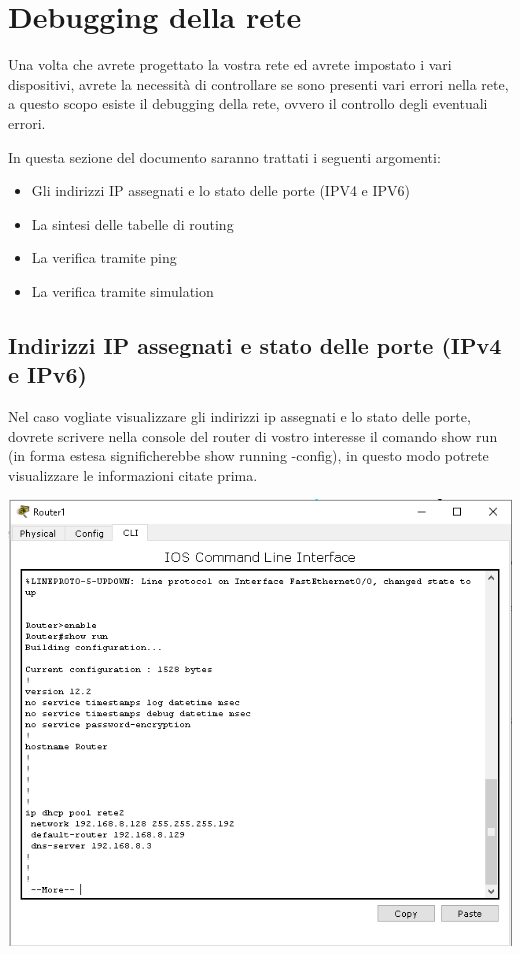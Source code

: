 \section{Debugging della rete}
Una volta che avrete progettato la vostra rete ed avrete impostato i vari dispositivi, avrete la necessità di controllare se sono presenti vari errori nella rete, a questo scopo esiste il debugging della rete, ovvero il controllo degli eventuali errori.

In questa sezione del documento saranno trattati i seguenti argomenti:

\begin{itemize}
    \item Gli indirizzi IP assegnati e lo stato delle porte (IPV4 e IPV6)
    \item La sintesi delle tabelle di routing
    \item La verifica tramite ping
    \item La verifica tramite simulation
\end{itemize}

\subsection{Indirizzi IP assegnati e stato delle porte (IPv4 e IPv6)}
Nel caso vogliate visualizzare gli indirizzi ip assegnati e lo stato delle porte, dovrete scrivere nella console del router di vostro interesse il comando show run (in forma estesa significherebbe show running -config), in questo modo potrete visualizzare le informazioni citate prima.

\begin{center}
    \includegraphics[width=\linewidth]{images/04.debugging-rete/01.png}
\end{center}

